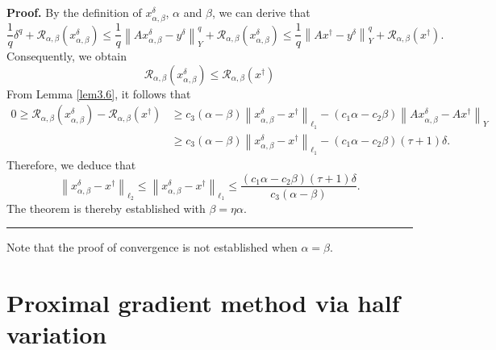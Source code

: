 \documentclass[a4paper,12pt]{article}
\numberwithin{equation}{section}
\newenvironment{proof}[1][Proof]{\textbf{#1.} }
{\ \rule{0.75em}{0.75em}\smallskip}
\begin{document}
\begin{proof}
    By the definition of $x_{\alpha,\beta}^{\delta}$, $\alpha$ and $\beta$, we can derive that 
    \begin{equation}\label{equ3.14}
        \frac{1}{q}\delta^{q}+\mathcal{R}_{\alpha,\beta}\left(x_{\alpha,\beta}^\delta\right) \leq \frac{1}{q}\left\|Ax_{\alpha,\beta}^{\delta}-y^{\delta}\right\|_{Y}^{q}+ \mathcal{R}_{\alpha,\beta}\left(x_{\alpha,\beta}^\delta\right) \leq  \frac{1}{q}\left\|Ax^{\dagger}-y^{\delta}\right\|_{Y}^{q}+ \mathcal{R}_{\alpha,\beta}\left(x^{\dagger}\right).
    \end{equation}
    Consequently, we obtain
    \begin{equation*}
        \mathcal{R}_{\alpha,\beta}\left(x_{\alpha,\beta}^\delta\right)\leq \mathcal{R}_{\alpha,\beta}\left(x^{\dagger}\right) 
    \end{equation*}
    From Lemma \ref{lem3.6}, it follows that 
    \begin{align}\label{equ3.15}
        0\geq \mathcal{R}_{\alpha,\beta}\left(x_{\alpha,\beta}^\delta\right)- \mathcal{R}_{\alpha,\beta}\left(x^{\dagger}\right)
        & \geq  c_{3}\left(\alpha-\beta\right)\left\|x_{\alpha,\beta}^\delta-x^{\dagger}\right\|_{\ell_{1}}- \left(c_{1}\alpha-c_{2}\beta\right)\left\|Ax_{\alpha,\beta}^\delta-Ax^{\dagger}\right\|_{Y}\nonumber\\
        & \geq  c_{3}\left(\alpha-\beta\right)\left\|x_{\alpha,\beta}^\delta-x^{\dagger}\right\|_{\ell_{1}}- \left(c_{1}\alpha-c_{2}\beta\right)\left(\tau+1\right)\delta.
    \end{align}
    Therefore, we deduce that
    \begin{equation*}
        \left\|x_{\alpha,\beta}^{\delta}-x^{\dagger}\right\|_{\ell_{2}}\leq \left\|x_{\alpha,\beta}^{\delta}-x^{\dagger}\right\|_{\ell_{1}}\leq \frac{\left(c_{1}\alpha-c_{2}\beta\right)\left(\tau+1\right)\delta} {c_{3}\left(\alpha-\beta\right)}.
    \end{equation*}
    The theorem is thereby established with $\beta=\eta\alpha$.
\end{proof}

\par Note that the proof of convergence is not established when $\alpha=\beta$.

\section{Proximal gradient method via half variation}\label{sec4}
\end{document}
